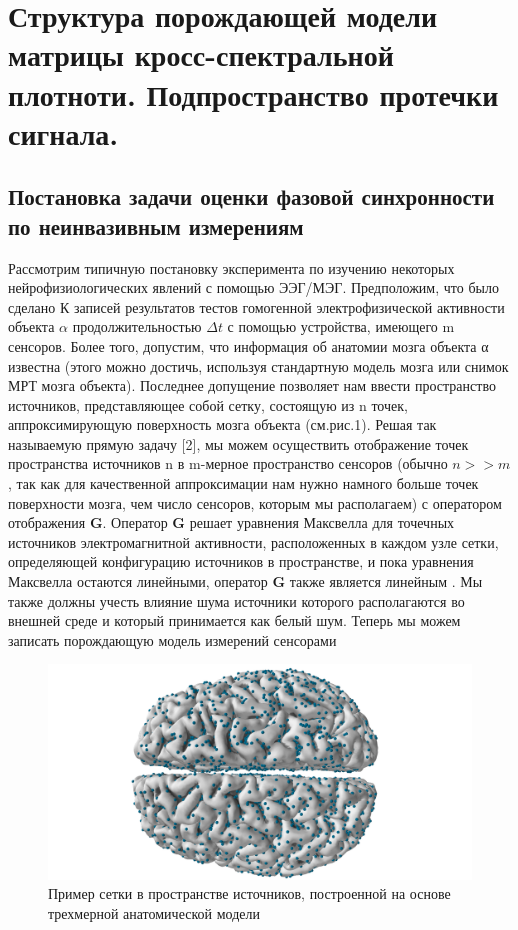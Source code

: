 \chapter{Структура порождающей модели матрицы кросс-спектральной плотноти. 
         Подпространство протечки сигнала.} \label{chapt1}

\section{Постановка задачи оценки фазовой синхронности по неинвазивным измерениям} \label{sect1_1}


Рассмотрим типичную постановку эксперимента по изучению некоторых
нейрофизиологических явлений с помощью ЭЭГ/МЭГ.
Предположим, что было сделано $К$ записей результатов тестов гомогенной электрофизической
активности объекта $\alpha$ продолжительностью $\Delta t$ с помощью устройства, имеющего m сенсоров.
Более того, допустим, что информация об анатомии мозга объекта α известна (этого можно достичь,
используя стандартную модель мозга или снимок МРТ мозга объекта).
Последнее допущение позволяет нам ввести пространство источников, представляющее собой сетку,
состоящую из n точек, аппроксимирующую поверхность мозга объекта (см.рис.1).
Решая так называемую прямую задачу [2], мы можем осуществить отображение точек пространства
источников n в m-мерное пространство сенсоров
(обычно $n >> m$, так как для качественной аппроксимации нам нужно намного
больше точек поверхности мозга, чем число сенсоров, которым мы располагаем)
с оператором отображения $\mathbf{G}$.
Оператор $\mathbf{G}$ решает уравнения Максвелла для точечных источников электромагнитной активности,
расположенных в каждом узле сетки, определяющей конфигурацию источников в пространстве,
и пока уравнения Максвелла остаются линейными, оператор $\mathbf{G}$ также является линейным \cite{Hamalainen1993}.
Мы также должны учесть влияние шума источники которого располагаются во внешней среде
и который принимается как белый шум.
Теперь мы можем записать порождающую модель измерений сенсорами

\begin{figure}
\centering
\includegraphics[scale=0.3]{../images/brain.png}
\caption{Пример сетки в пространстве источников,
          построенной на основе трехмерной анатомической модели}
\label{fig:src_space}
\end{figure}


